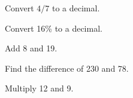 

\begin{stmt}
Convert $4/7$ to a decimal.
\end{stmt}

\begin{sol}

\end{sol}


\begin{stmt}
Convert 16\% to a decimal.
\end{stmt}

\begin{sol}

\end{sol}


\begin{stmt}
Add 8 and 19.
\end{stmt}

\begin{sol}

\end{sol}


\begin{stmt}
Find the difference of 230 and 78.
\end{stmt}

\begin{sol}

\end{sol}


\begin{stmt}
Multiply 12 and 9.
\end{stmt}

\begin{sol}

\end{sol}


